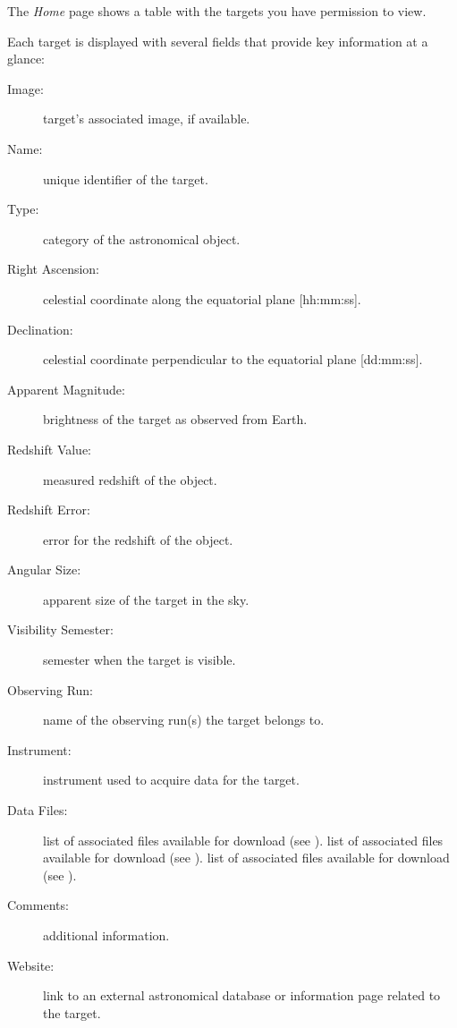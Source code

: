  

The \textsl{Home} page shows a table with the targets you have permission to view. 



Each target is displayed with several fields that provide key information at a glance:

\begin{description}
	\item[Image:] target's associated image, if available.
	\item[Name:] unique identifier of the target.
	\item[Type:] category of the astronomical object.
	\item[Right Ascension:] celestial coordinate along the equatorial plane [hh:mm:ss].
	\item[Declination:] celestial coordinate perpendicular to the equatorial plane [dd:mm:ss].
	\item[Apparent Magnitude:] brightness of the target as observed from Earth.
	\item[Redshift Value:] measured redshift of the object.
	\item[Redshift Error:] error for the redshift of the object.
	\item[Angular Size:] apparent size of the target in the sky.
	\item[Visibility Semester:] semester when the target is visible.
	\item[Observing Run:] name of the observing run(s) the target belongs to.
	\item[Instrument:] instrument used to acquire data for the target.
	\item[Data Files:] 
		\rolecontent{\role}
		{%
			list of associated files available for download (see ).
		}
		{%
			list of associated files available for download (see ).
		}
		{%
			list of associated files available for download (see ).
		}
	\item[Comments:] additional information.
	\item[Website:] link to an external astronomical database or information page related to the target.
\end{description}




